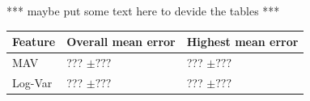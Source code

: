 \documentclass[landscape,a0paper,fontscale=0.375]{baposter} %
\begin{document}
\begin{poster}
{*** maybe put some text here to devide the tables ***

\begin{center}
\begin{tabular}{l l l}
\toprule
\textbf{Feature} & \textbf{Overall mean error} & \textbf{Highest mean error}\\
\midrule
MAV & ??? $\pm ???$ & ??? $\pm ???$ \\
Log-Var & ??? $\pm ???$ & ??? $\pm ???$ \\
\bottomrule
\end{tabular}
\end{center}
}


\end{poster}
\end{document}

